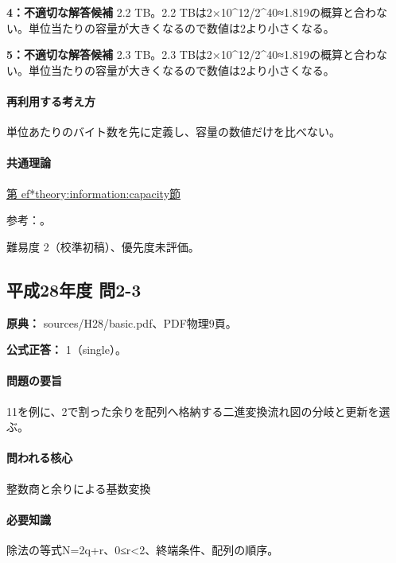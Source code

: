 \noindent\textbf{4：不適切な解答候補} 2.2 TB。2.2 TBは2×10\textasciicircum{}12/2\textasciicircum{}40≈1.819の概算と合わない。単位当たりの容量が大きくなるので数値は2より小さくなる。\par

\noindent\textbf{5：不適切な解答候補} 2.3 TB。2.3 TBは2×10\textasciicircum{}12/2\textasciicircum{}40≈1.819の概算と合わない。単位当たりの容量が大きくなるので数値は2より小さくなる。\par

\paragraph{再利用する考え方} 単位あたりのバイト数を先に定義し、容量の数値だけを比べない。

\paragraph{共通理論} \hyperref[theory:information:capacity]{第
ef*{theory:information:capacity}節}

\par 参考：\cite{nist_binary_prefix}。

\par 難易度 2（校準初稿）、優先度未評価。

\subsection{平成28年度 問2-3}
\label{q:h28-reg-basic-2-3}

\noindent\textbf{原典：} sources/H28/basic.pdf、PDF物理9頁。

\textbf{公式正答：} 1（single）。

\paragraph{問題の要旨} 11を例に、2で割った余りを配列へ格納する二進変換流れ図の分岐と更新を選ぶ。

\paragraph{問われる核心} 整数商と余りによる基数変換

\paragraph{必要知識} 除法の等式N=2q+r、0≤r<2、終端条件、配列の順序。

